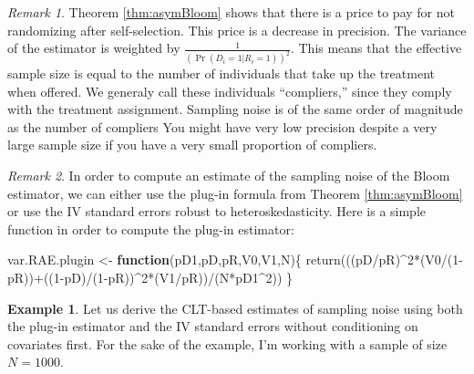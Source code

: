 \documentclass[
]{book}
\newenvironment{Shaded}{\begin{snugshade}}{\end{snugshade}}
\newcommand{\ControlFlowTok}[1]{\textcolor[rgb]{0.13,0.29,0.53}{\textbf{#1}}}
\newcommand{\DecValTok}[1]{\textcolor[rgb]{0.00,0.00,0.81}{#1}}
\newcommand{\FunctionTok}[1]{\textcolor[rgb]{0.00,0.00,0.00}{#1}}
\newcommand{\NormalTok}[1]{#1}
\newcommand{\OtherTok}[1]{\textcolor[rgb]{0.56,0.35,0.01}{#1}}
\newcommand{\SpecialCharTok}[1]{\textcolor[rgb]{0.00,0.00,0.00}{#1}}
\theoremstyle{definition}
\theoremstyle{definition}
\newtheorem{example}{Example}[chapter]
\theoremstyle{definition}
\theoremstyle{definition}
\theoremstyle{remark}
\newtheorem*{remark}{Remark}
\begin{document}
\begin{remark}
\iffalse{} {Remark. } \fi{}Theorem \ref{thm:asymBloom} shows that there is a price to pay for not randomizing after self-selection.
This price is a decrease in precision.
The variance of the estimator is weighted by \(\frac{1}{(\Pr(D_i=1|R_i=1))^2}\).
This means that the effective sample size is equal to the number of individuals that take up the treatment when offered.
We generaly call these individuals ``compliers,'' since they comply with the treatment assignment.
Sampling noise is of the same order of magnitude as the number of compliers
You might have very low precision despite a very large sample size if you have a very small proportion of compliers.
\end{remark}

\begin{remark}
\iffalse{} {Remark. } \fi{}In order to compute an estimate of the sampling noise of the Bloom estimator, we can either use the plug-in formula from Theorem \ref{thm:asymBloom} or use the IV standard errors robust to heteroskedasticity.
Here is a simple function in order to compute the plug-in estimator:
\end{remark}

\begin{Shaded}
\begin{Highlighting}[]
\NormalTok{var.RAE.plugin }\OtherTok{\textless{}{-}} \ControlFlowTok{function}\NormalTok{(pD1,pD,pR,V0,V1,N)\{}
  \FunctionTok{return}\NormalTok{(((pD}\SpecialCharTok{/}\NormalTok{pR)}\SpecialCharTok{\^{}}\DecValTok{2}\SpecialCharTok{*}\NormalTok{(V0}\SpecialCharTok{/}\NormalTok{(}\DecValTok{1}\SpecialCharTok{{-}}\NormalTok{pR))}\SpecialCharTok{+}\NormalTok{((}\DecValTok{1}\SpecialCharTok{{-}}\NormalTok{pD)}\SpecialCharTok{/}\NormalTok{(}\DecValTok{1}\SpecialCharTok{{-}}\NormalTok{pR))}\SpecialCharTok{\^{}}\DecValTok{2}\SpecialCharTok{*}\NormalTok{(V1}\SpecialCharTok{/}\NormalTok{pR))}\SpecialCharTok{/}\NormalTok{(N}\SpecialCharTok{*}\NormalTok{pD1}\SpecialCharTok{\^{}}\DecValTok{2}\NormalTok{))}
\NormalTok{\}}
\end{Highlighting}
\end{Shaded}

\begin{example}
\protect\hypertarget{exm:unnamed-chunk-104}{}{\label{exm:unnamed-chunk-104} }Let us derive the CLT-based estimates of sampling noise using both the plug-in estimator and the IV standard errors without conditioning on covariates first.
For the sake of the example, I'm working with a sample of size \(N=1000\).
\end{example}
\end{document}
